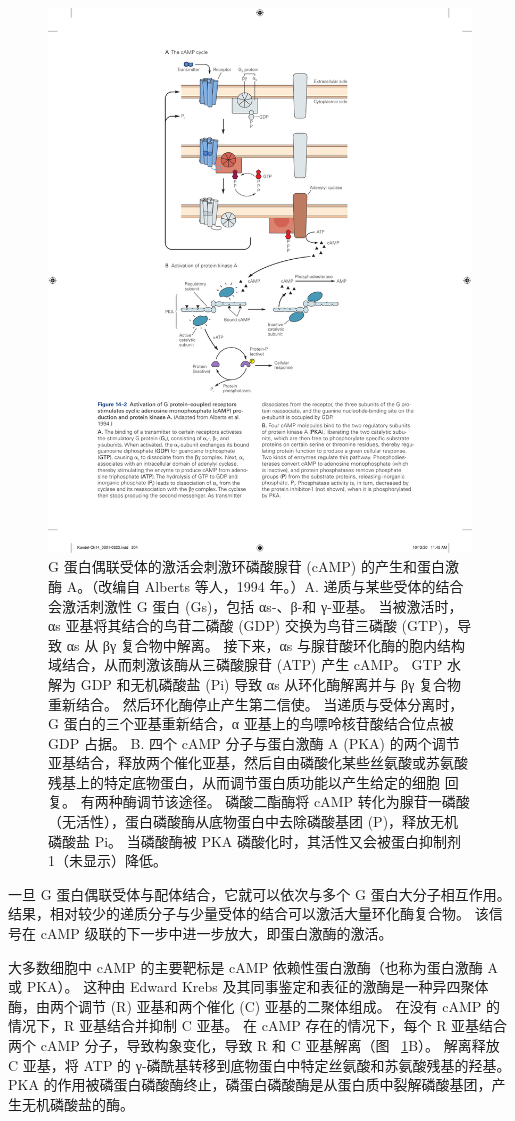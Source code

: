 \begin{figure}[htbp]
	\centering
	\includegraphics[width=0.65\linewidth]{chap14/fig_14_2}
	\caption{G 蛋白偶联受体的激活会刺激环磷酸腺苷 (cAMP) 的产生和蛋白激酶 A。（改编自 Alberts 等人，1994 年。）A. 递质与某些受体的结合会激活刺激性 G 蛋白 (Gs)，包括 αs-、β-和 γ-亚基。 当被激活时，αs 亚基将其结合的鸟苷二磷酸 (GDP) 交换为鸟苷三磷酸 (GTP)，导致 αs 从 βγ 复合物中解离。 接下来，αs 与腺苷酸环化酶的胞内结构域结合，从而刺激该酶从三磷酸腺苷 (ATP) 产生 cAMP。 GTP 水解为 GDP 和无机磷酸盐 (Pi) 导致 αs 从环化酶解离并与 βγ 复合物重新结合。 然后环化酶停止产生第二信使。 当递质与受体分离时，G 蛋白的三个亚基重新结合，α 亚基上的鸟嘌呤核苷酸结合位点被 GDP 占据。 B. 四个 cAMP 分子与蛋白激酶 A (PKA) 的两个调节亚基结合，释放两个催化亚基，然后自由磷酸化某些丝氨酸或苏氨酸残基上的特定底物蛋白，从而调节蛋白质功能以产生给定的细胞 回复。 有两种酶调节该途径。 磷酸二酯酶将 cAMP 转化为腺苷一磷酸（无活性），蛋白磷酸酶从底物蛋白中去除磷酸基团 (P)，释放无机磷酸盐 Pi。 当磷酸酶被 PKA 磷酸化时，其活性又会被蛋白抑制剂 1（未显示）降低。}
	\label{fig:14_2}
\end{figure}


一旦 G 蛋白偶联受体与配体结合，它就可以依次与多个 G 蛋白大分子相互作用。
结果，相对较少的递质分子与少量受体的结合可以激活大量环化酶复合物。
该信号在 cAMP 级联的下一步中进一步放大，即蛋白激酶的激活。


大多数细胞中 cAMP 的主要靶标是 cAMP 依赖性蛋白激酶（也称为蛋白激酶 A 或 PKA）。
这种由 Edward Krebs 及其同事鉴定和表征的激酶是一种异四聚体酶，由两个调节 (R) 亚基和两个催化 (C) 亚基的二聚体组成。
在没有 cAMP 的情况下，R 亚基结合并抑制 C 亚基。 在 cAMP 存在的情况下，每个 R 亚基结合两个 cAMP 分子，导致构象变化，导致 R 和 C 亚基解离（图 ~\ref{fig:14_2}B）。
解离释放 C 亚基，将 ATP 的 γ-磷酰基转移到底物蛋白中特定丝氨酸和苏氨酸残基的羟基。
PKA 的作用被磷蛋白磷酸酶终止，磷蛋白磷酸酶是从蛋白质中裂解磷酸基团，产生无机磷酸盐的酶。


